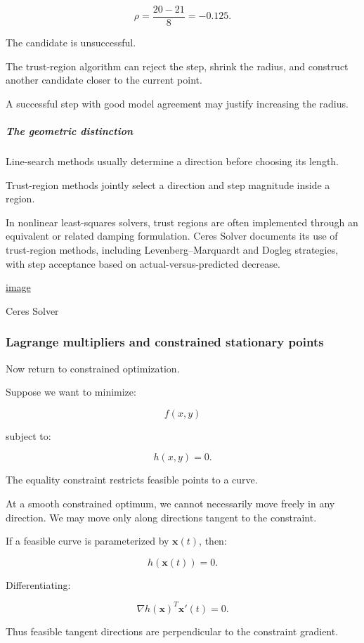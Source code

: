 \[
\rho=\frac{20-21}{8}=-0.125.
\]

The candidate is unsuccessful.

The trust-region algorithm can reject the step, shrink the radius, and construct another candidate closer to the current point.

A successful step with good model agreement may justify increasing the radius.

\subparagraph{The geometric distinction}\label{the-geometric-distinction}

Line-search methods usually determine a direction before choosing its length.

Trust-region methods jointly select a direction and step magnitude inside a region.

In nonlinear least-squares solvers, trust regions are often implemented through an equivalent or related damping formulation. Ceres Solver documents its use of trust-region methods, including Levenberg--Marquardt and Dogleg strategies, with step acceptance based on actual-versus-predicted decrease. 

\href{https://www.google.com/s2/favicons?domain=https://ceres-solver.readthedocs.io&sz=32}{image}

Ceres Solver

\subsubsection{Lagrange multipliers and constrained stationary points}\label{lagrange-multipliers-and-constrained-stationary-points}

Now return to constrained optimization.

Suppose we want to minimize:

\[
f(x,y)
\]

subject to:

\[
h(x,y)=0.
\]

The equality constraint restricts feasible points to a curve.

At a smooth constrained optimum, we cannot necessarily move freely in any direction. We may move only along directions tangent to the constraint.

If a feasible curve is parameterized by \(\mathbf x(t)\), then:

\[
h(\mathbf x(t))=0.
\]

Differentiating:

\[
\nabla h(\mathbf x)^T\mathbf x'(t)=0.
\]

Thus feasible tangent directions are perpendicular to the constraint gradient.

